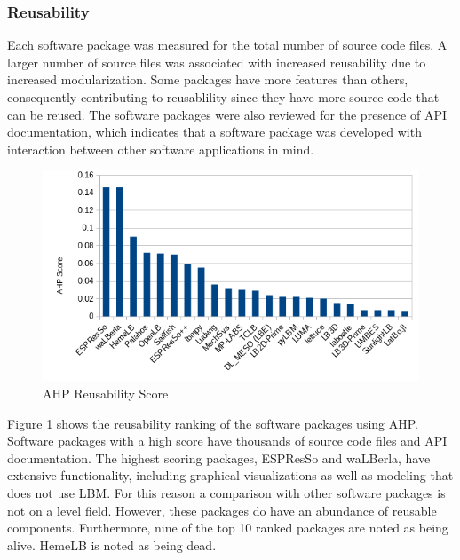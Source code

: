 \documentclass[12pt, notitlepage]{article}
\begin{document}
\subsubsection{Reusability}\label{reusabilityresults}

Each software package was measured for the total number of source code files. A larger number of source files was associated with increased reusability due to increased modularization. Some packages have more features than others, consequently contributing to reusablility since they have more source code that can be reused. The software packages were also reviewed for the presence of API documentation, which indicates that a software package was developed with interaction between other software applications in mind. 

\begin{figure}[h!]
	\begin{center}
		\includegraphics[width=1.0\textwidth]{reusability_chart}
		\caption{AHP Reusability Score}
		\label{Fig_Reusabilty}
	\end{center}
\end{figure}

Figure \ref{Fig_Reusabilty} shows the reusability ranking of the software packages using AHP. Software packages with a high score have thousands of source code files and API documentation. The highest scoring packages, ESPResSo and waLBerla, have extensive functionality, including graphical visualizations as well as modeling that does not use LBM. For this reason a comparison with other software packages is not on a level field. However, these packages do have an abundance of reusable components. Furthermore, nine of the top 10 ranked packages are noted as being alive. HemeLB is noted as being dead.
\end{document}
